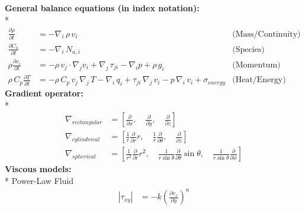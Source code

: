 \documentclass[calculator,datasheet,handbook]{exam}
\begin{document}
\begin{datasheet}
  {\bf General balance equations (in index notation):}\\*
  \begin{align}
    \frac{\partial \rho}{\partial t} &= -\nabla_i\,\rho\,v_i\label{eq:continuity} & \text{(Mass/Continuity)}\\
    \frac{\partial C_a}{\partial t} &= -\nabla_i\,N_{a,i}& \text{(Species)}\\
    \rho \frac{\partial v_i}{\partial t} &= -\rho\,v_j\cdot\nabla_j v_i
    + \nabla_j\,\tau_{ji} - \nabla_i
    p + \rho\,g_i\label{eq:momentumbalance} & \text{(Momentum)}\\
    \rho\,C_p\frac{\partial T}{\partial t} &= -\rho\,C_p\, v_j
    \,\nabla_j\,T - \nabla_i\,q_i + \tau_{ji}\,\nabla_j\,v_i -
    p\,\nabla_i\,v_i +\sigma_{energy}\label{eq:energybalance} & \text{(Heat/Energy)}
  \end{align}
  {\bf Gradient operator:}\\*
  \begin{align}
    \nabla_{rectangular} &= \left[\frac{\partial}{\partial x},\quad
      \frac{\partial}{\partial y}, \quad\frac{\partial}{\partial z}\right]\\
    \nabla_{cylindrical} &=\left[\frac{1}{r}\frac{\partial}{\partial r}
      r,\quad\frac{1}{r}\frac{\partial}{\partial \theta},\quad
      \frac{\partial}{\partial z}\right]\\
    \nabla_{spherical} &= \left[ \frac{1}{r^2} \frac{\partial }{\partial r} r^2,
      \quad \frac{1}{r\sin\theta} \frac{\partial }{\partial \theta}
      \sin\theta, \quad
      \frac{1}{r\sin\theta}\frac{\partial}{\partial \phi}\right]
  \end{align}
  {\bf Viscous models:}\\*
  Power-Law Fluid
  \begin{align*}
    \left|\tau_{xy}\right| &= -k \left(\frac{\partial v_x}{\partial y}\right)^{n}
  \end{align*}

\end{datasheet}
\end{document}
